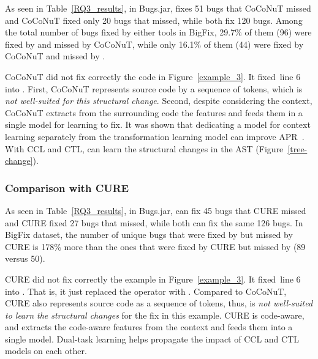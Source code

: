 As seen in Table~\ref{RQ3_results}, in Bugs\-.jar, {\tool} fixes 51
bugs that CoCoNuT missed and CoCoNuT fixed only 20 bugs that {\tool}
missed, while both fix 120 bugs. Among the total
number of bugs fixed by either tools in BigFix, 29.7\% of them (96)
were fixed by {\tool} and missed by CoCoNuT, while only 16.1\% of them (44)
were fixed by CoCoNuT and missed by {\tool}.

CoCoNuT did not fix correctly the code in Figure~\ref{example_3}.  It
fixed~line 6 into  
. First, CoCoNuT represents source code by a
sequence of tokens, which is {\em not well-suited for this structural
change}. Second, despite considering the context,
CoCoNuT extracts from the surrounding code the features and feeds them
in a single model for learning to fix.
%
It was shown that dedicating a model for context learning separately
from the transformation learning model can improve APR~\cite{icse20}.
With CCL and CTL, {\tool} can learn the structural changes in the AST
(Figure~\ref{tree-change}).

\subsubsection{\bf Comparison with CURE}

As seen in Table~\ref{RQ3_results}, in Bugs.jar, {\tool} can fix 45
bugs that CURE missed and CURE fixed 27 bugs that {\tool} missed,
while both can fix the same 126 bugs. In BigFix dataset, the number of
unique bugs that were fixed by {\tool} but missed by CURE is 178\%
more than the ones that were fixed by CURE but missed by {\tool} (89
versus 50).

CURE did not fix correctly the example in Figure~\ref{example_3}. It
fixed~line 6 into 
  \code{/} .
That is, it just replaced the operator \code{\%} with \code{/}.
Compared to CoCoNuT, CURE also represents source code as a sequence of
tokens, thus, is {\em not well-suited to learn the structural changes} for
the fix in this example. CURE is code-aware,
and extracts the code-aware features from the context and feeds them
into a single model.
Dual-task learning helps propagate the impact of CCL and CTL
models on each other.


